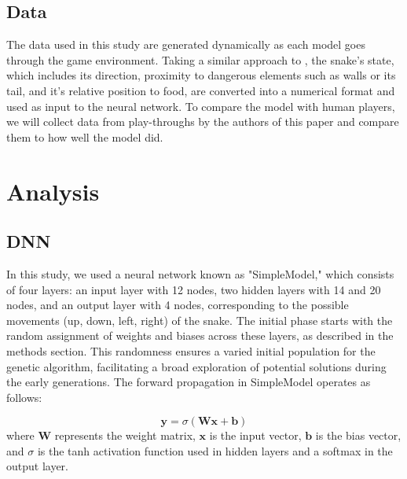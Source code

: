 \documentclass{article}
\begin{document}
\subsection{Data}
The data used in this study are generated dynamically as each model goes through the game environment. Taking a similar approach to \cite{snakeai2020}, the snake's state, which includes its direction, proximity to dangerous elements such as walls or its tail, and it's relative position to food, are converted into a numerical format and used as input to the neural network. 
\newline
\newline
To compare the model with human players, we will collect data from play-throughs by the authors of this paper and compare them to how well the model did.

\section{Analysis}

\subsection{DNN}
In this study, we used a neural network known as "SimpleModel," which consists of four layers: an input layer with 12 nodes, two hidden layers with 14 and 20 nodes, and an output layer with 4 nodes, corresponding to the possible movements (up, down, left, right) of the snake.
\newline
\newline
The initial phase starts with the random assignment of weights and biases across these layers, as described in the methods section. This randomness ensures a varied initial population for the genetic algorithm, facilitating a broad exploration of potential solutions during the early generations. 
\newline
The forward propagation in SimpleModel operates as follows:

\[
\mathbf{y} = \sigma(\mathbf{W} \mathbf{x} + \mathbf{b})
\]
\newline
where \(\mathbf{W}\) represents the weight matrix, \(\mathbf{x}\) is the input vector, \(\mathbf{b}\) is the bias vector, and \(\sigma\) is the tanh activation function used in hidden layers and a softmax in the output layer.
\end{document}
